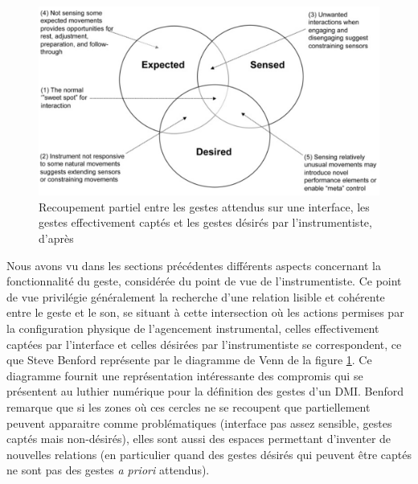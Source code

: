 \begin{figure}[!ht]
	\captionsetup{format=plain}%
	  \includegraphics[width=\linewidth]{gfx/03_gesture/Benford_expected-sensed-desired.png}
		\caption[Recoupement partiel entre les gestes attendus sur une interface, les gestes désirés par l'instrumentiste, et les gestes effectivement captés]{Recoupement partiel entre les gestes attendus sur une interface, les gestes effectivement captés et les gestes désirés par l'instrumentiste, d'après \cite{benford_performing_2010}}
		\label{fig:Benford_expected-sensed-desired}
\end{figure}
\noindent Nous avons vu dans les sections précédentes différents aspects concernant la fonctionnalité du geste, considérée du point de vue de l'instrumentiste. Ce point de vue privilégie généralement la recherche d'une relation lisible et cohérente entre le geste et le son, se situant à cette intersection où les actions permises par la configuration physique de l'agencement instrumental, celles effectivement captées par l'interface et celles désirées par l'instrumentiste se correspondent, ce que Steve Benford représente par le diagramme de Venn de la figure \ref{fig:Benford_expected-sensed-desired}. Ce diagramme fournit une représentation intéressante des compromis qui se présentent au luthier numérique pour la définition des gestes d'un \gls{DMI}. Benford remarque que si les zones où ces cercles ne se recoupent que partiellement peuvent apparaitre comme problématiques (interface pas assez sensible, gestes captés mais non-désirés), elles sont aussi des espaces permettant d'inventer de nouvelles relations (en particulier quand des gestes désirés qui peuvent être captés ne sont pas des gestes \textit{a priori} attendus).\\
